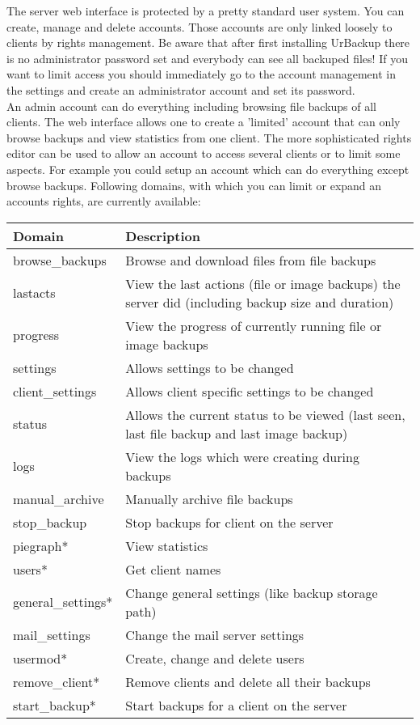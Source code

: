 \documentclass[a4paper,10pt]{article}
\begin{document}
The server web interface is protected by a pretty standard user system. You can
create, manage and delete accounts. Those accounts are only linked loosely to
clients by rights management. Be aware that after first installing UrBackup
there is no administrator password set and everybody can see all backuped files!
If you want to limit access you should immediately go to the account management
in the settings and create an administrator account and set its password.\\
An admin account can do everything including browsing file backups of all
clients. The web interface allows one to create a 'limited' account that can only
browse backups and view statistics from one client. The more sophisticated
rights editor can be used to allow an account to access several clients or to
limit some aspects. For example you could setup an account which can do
everything except browse backups.
Following domains, with which you can limit or expand an accounts rights, are
currently available:

\begin{tabular}{|l|p{}|}
\hline
Domain  & Description \\
\hline\hline
browse\_backups & Browse and download files from file backups\\
lastacts & View the last actions (file or image backups) the server did (including backup size and duration)\\
progress & View the progress of currently running file or image backups\\
settings & Allows settings to be changed \\
client\_settings & Allows client specific settings to be changed \\
status & Allows the current status to be viewed (last seen, last file backup and last image backup)\\
logs & View the logs which were creating during backups\\
manual\_archive & Manually archive file backups\\
stop\_backup & Stop backups for client on the server\\
piegraph* & View statistics\\
users* & Get client names\\
general\_settings* & Change general settings (like backup storage path)\\
mail\_settings & Change the mail server settings \\
usermod* & Create, change and delete users\\
remove\_client* & Remove clients and delete all their backups\\
start\_backup* & Start backups for a client on the server\\

\hline
\end{tabular}
\end{document}
